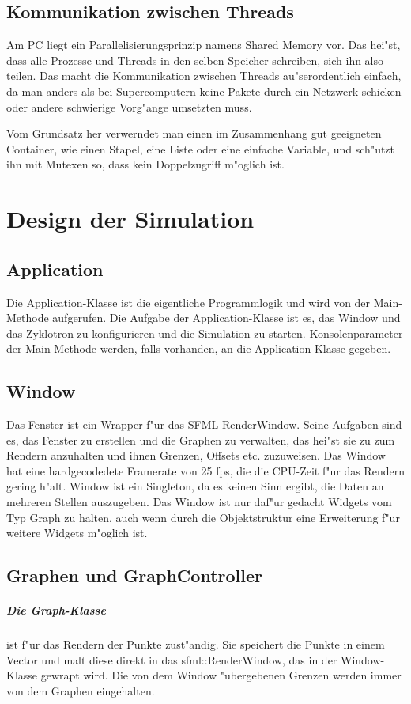 \documentclass[14pt, a4paper]{report}
\begin{document}
\section{Kommunikation zwischen Threads}
Am PC liegt ein Parallelisierungsprinzip namens Shared Memory vor. Das hei"st, dass 
alle Prozesse und Threads in den selben Speicher schreiben, sich ihn also teilen. 
Das macht die Kommunikation zwischen Threads au"serordentlich einfach, da man anders als
bei Supercomputern keine Pakete durch ein Netzwerk schicken oder andere schwierige 
Vorg"ange umsetzten muss. 

Vom Grundsatz her verwerndet man einen im Zusammenhang gut geeigneten Container, wie
einen Stapel, eine Liste oder eine einfache Variable, und sch"utzt ihn mit Mutexen so, dass 
kein Doppelzugriff m"oglich ist.

\chapter{Design der Simulation}
\section{Application}
Die Application-Klasse ist die eigentliche Programmlogik und wird von der Main-Methode
aufgerufen. Die Aufgabe der Application-Klasse ist es, das Window und das Zyklotron
zu konfigurieren und die Simulation zu starten. Konsolenparameter der Main-Methode
werden, falls vorhanden, an die Application-Klasse gegeben.

\section{Window} 
Das Fenster ist ein Wrapper f"ur das SFML-RenderWindow. Seine Aufgaben sind es, das 
Fenster zu erstellen und die Graphen zu verwalten, das hei"st sie zu zum Rendern 
anzuhalten und ihnen Grenzen, Offsets etc. zuzuweisen. Das Window hat eine 
hardgecodedete Framerate von 25 fps, die die CPU-Zeit f"ur das Rendern gering h"alt.
Window ist ein Singleton, da es keinen Sinn ergibt, die Daten an mehreren Stellen 
auszugeben. Das Window ist nur daf"ur gedacht Widgets vom Typ Graph zu halten,
auch wenn durch die Objektstruktur eine Erweiterung f"ur weitere Widgets m"oglich ist.

\section{Graphen und GraphController}
\paragraph{Die Graph-Klasse} ist f"ur das Rendern der Punkte zust"andig. Sie speichert
die Punkte in einem Vector und malt diese direkt in das sfml::RenderWindow, das in der
Window-Klasse gewrapt wird. Die von dem Window "ubergebenen Grenzen werden immer von dem
Graphen eingehalten.
\end{document}

